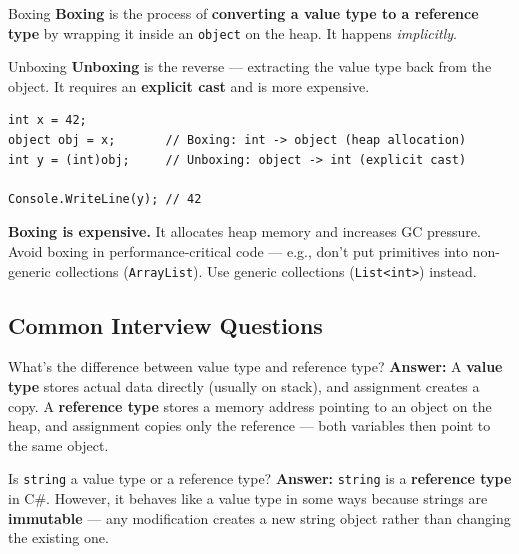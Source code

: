 \documentclass[11pt,a4paper]{article}
\begin{document}
\begin{defnBox}{Boxing}
\textbf{Boxing} is the process of \textbf{converting a value type to a reference type} by wrapping it inside an \texttt{object} on the heap. It happens \textit{implicitly}.
\end{defnBox}

\begin{defnBox}{Unboxing}
\textbf{Unboxing} is the reverse — extracting the value type back from the object. It requires an \textbf{explicit cast} and is more expensive.
\end{defnBox}

\begin{lstlisting}[caption={Boxing and Unboxing}]
int x = 42;
object obj = x;       // Boxing: int -> object (heap allocation)
int y = (int)obj;     // Unboxing: object -> int (explicit cast)

Console.WriteLine(y); // 42
\end{lstlisting}

\begin{gotchaBox}
\textbf{Boxing is expensive.} It allocates heap memory and increases GC pressure. Avoid boxing in performance-critical code — e.g., don't put primitives into non-generic collections (\texttt{ArrayList}). Use generic collections (\texttt{List<int>}) instead.
\end{gotchaBox}

\subsection{Common Interview Questions}

\begin{intqBox}{What's the difference between value type and reference type?}
\textbf{Answer:} A \textbf{value type} stores actual data directly (usually on stack), and assignment creates a copy. A \textbf{reference type} stores a memory address pointing to an object on the heap, and assignment copies only the reference — both variables then point to the same object.
\end{intqBox}

\begin{intqBox}{Is \texttt{string} a value type or a reference type?}
\textbf{Answer:} \texttt{string} is a \textbf{reference type} in C\#. However, it behaves like a value type in some ways because strings are \textbf{immutable} — any modification creates a new string object rather than changing the existing one.
\end{intqBox}
\end{document}
